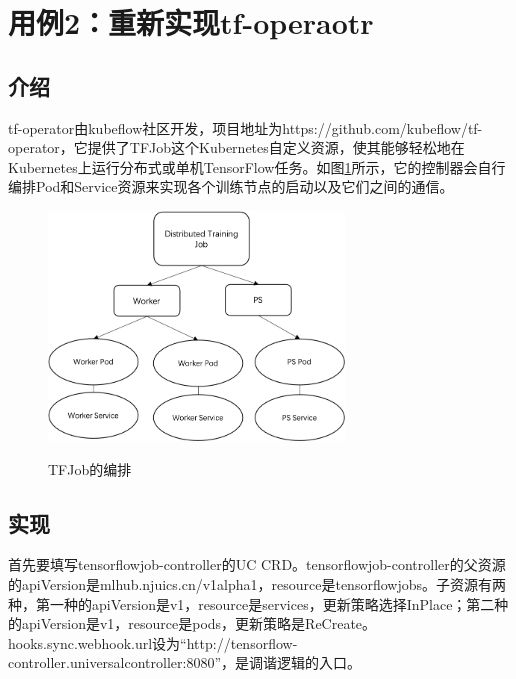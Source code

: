 \documentclass[macfonts,master]{njuthesis}
\begin{document}
\section{用例2：重新实现tf-operaotr}
\subsection{介绍}
tf-operator由kubeflow社区开发，项目地址为https://github.com/kubeflow/tf-operator，它提供了TFJob这个Kubernetes自定义资源，使其能够轻松地在Kubernetes上运行分布式或单机TensorFlow任务。如图\ref{fig:tfjobtrans}所示，它的控制器会自行编排Pod和Service资源来实现各个训练节点的启动以及它们之间的通信。

\begin{figure}[htbp]
  \centering
  \includegraphics[width=0.7\textwidth]{pics/tfjobtrans.png}\\
  \caption{TFJob的编排}\label{fig:tfjobtrans}
\end{figure}

\subsection{实现}

首先要填写tensorflowjob-controller的UC CRD。tensorflowjob-controller的父资源的apiVersion是mlhub.njuics.cn/v1alpha1，resource是tensorflowjobs。子资源有两种，第一种的apiVersion是v1，resource是services，更新策略选择InPlace；第二种的apiVersion是v1，resource是pods，更新策略是ReCreate。hooks.sync.webhook.url设为``http://tensorflow-controller.universalcontroller:8080''，是调谐逻辑的入口。
\end{document}
